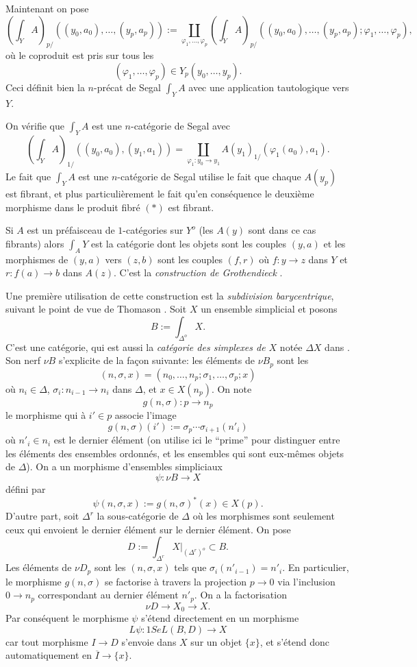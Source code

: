 \documentclass[12pt]{article}
\begin{document}
Maintenant on pose
$$
(\int _YA)_{p/}((y_0,a_0),\ldots , (y_p,a_p))
:=
\coprod _{\varphi _1,\ldots , \varphi _p}(\int _YA)_{p/}((y_0,a_0),\ldots ,
(y_p,a_p); \varphi _1,\ldots , \varphi _p),
$$
o\`u le coproduit est pris sur tous les
$$
(\varphi _1,\ldots , \varphi _p)\in Y_{p}(y_0,\ldots , y_p).
$$
Ceci d\'efinit bien la $n$-pr\'ecat de Segal $\int _YA$ avec une application
tautologique vers $Y$.

On v\'erifie que $\int _YA$ est une $n$-cat\'egorie de Segal avec
$$
(\int _YA)_{1/}((y_0,a_0), (y_1,a_1))=\coprod _{\varphi _1: y_0\rightarrow y_1}
A(y_1)_{1/}(\varphi _1(a_0), a_1).
$$
Le fait que $\int _YA$ est une $n$-cat\'egorie de Segal utilise le fait que
chaque $A(y_p)$ est fibrant, et plus particuli\`erement le fait qu'en
cons\'equence le deuxi\`eme morphisme dans le produit fibr\'e $(\ast )$ est
fibrant.



Si $A$ est un pr\'efaisceau de $1$-cat\'egories sur $Y^o$ (les $A(y)$ sont
dans ce cas fibrants) alors $\int _AY$ est la cat\'egorie dont les objets sont
les couples $(y,a)$ et les morphismes de $(y,a)$ vers $(z,b)$ sont les couples
$(f,r)$ o\`u $f: y\rightarrow z$ dans $Y$ et $r: f(a)\rightarrow b$ dans $A(z)$.
C'est la {\em construction de Grothendieck} \cite{SGA1} \cite{ThomasonLimits}
\cite{DwyerKan2}.


Une premi\`ere utilisation de cette construction est la {\em subdivision
barycentrique}, suivant le point de vue de Thomason \cite{ThomasonLimits}.
Soit $X$ un ensemble simplicial et posons
$$
B:= \int _{\Delta ^o} X.
$$
C'est une cat\'egorie, qui est aussi la {\em cat\'egorie des simplexes de $X$}
not\'ee $\Delta X$ dans \cite{Hirschhorn} \cite{DHK}.
Son nerf $\nu B$ s'explicite de la fa\c{c}on suivante: les \'el\'ements de
$\nu B_p$ sont les
$$
(n,\sigma , x)= (n_0,\ldots , n_p; \sigma _1,\ldots , \sigma _p; x)
$$
o\`u $n_i\in \Delta$, $\sigma _i: n_{i-1}\rightarrow n_i$ dans $\Delta$,
et $x\in X(n_p)$. On note
$$
g(n,\sigma ): p\rightarrow n_p
$$
le morphisme qui \`a $i'\in p$ associe l'image
$$
g(n,\sigma )(i'):= \sigma _p\cdots \sigma _{i+1}(n'_i)
$$
o\`u $n'_i\in n_i$ est le dernier \'el\'ement (on utilise ici le ``prime''
pour distinguer entre les \'el\'ements des ensembles ordonn\'es, et les
ensembles
qui sont eux-m\^emes objets de $\Delta$). On  a un morphisme
d'ensembles simpliciaux
$$
\psi : \nu B \rightarrow X
$$
d\'efini par
$$
\psi (n,\sigma , x):= g(n,\sigma )^{\ast} (x)\in X(p).
$$
D'autre part, soit $\Delta ^r$ la sous-cat\'egorie de $\Delta$ o\`u les
morphismes sont seulement ceux qui envoient le dernier \'el\'ement sur le
dernier \'el\'ement. On pose
$$
D:=\int _{\Delta ^r} X|_{(\Delta ^r)^o} \subset B.
$$
Les \'el\'ements de $\nu D_p$ sont les $(n,\sigma , x)$ tels que
$\sigma _i(n'_{i-1})=n'_i$. En particulier, le morphisme
$g(n,\sigma )$ se factorise \`a travers la projection $p\rightarrow 0$
via l'inclusion $0\rightarrow n_p$ correspondant au dernier \'el\'ement $n'_p$.
On a la factorisation
$$
\nu D\rightarrow X_0 \rightarrow X.
$$
Par cons\'equent le morphisme $\psi$ s'\'etend directement en un morphisme
$$
L\psi : 1SeL(B,D)\rightarrow X
$$
car tout morphisme $I\rightarrow D$ s'envoie dans $X$ sur un objet $\{ x\}$,
et s'\'etend donc automatiquement en $\overline{I}\rightarrow \{ x\}$.
\end{document}
